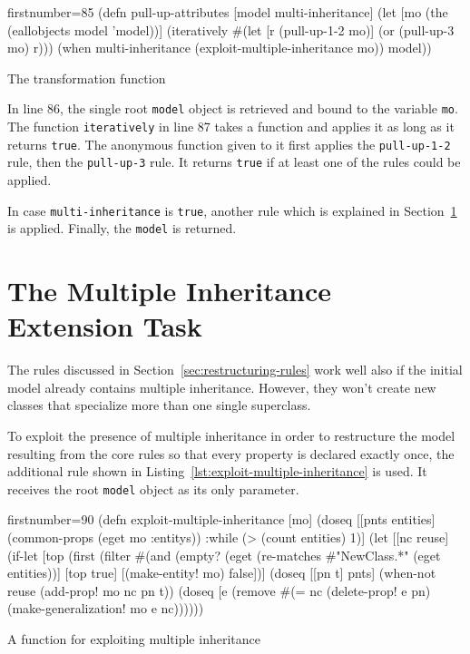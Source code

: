 \documentclass[11pt]{article}
\begin{document}
\begin{listing}[htbp]
  \begin{clojurecode*}{firstnumber=85}
(defn pull-up-attributes [model multi-inheritance]
  (let [mo (the (eallobjects model 'model))]
    (iteratively #(let [r (pull-up-1-2 mo)]
                    (or (pull-up-3 mo) r)))
    (when multi-inheritance (exploit-multiple-inheritance mo))
    model))
  \end{clojurecode*}
  \caption{The transformation function}
    \label{lst:pull-up-attributes}
\end{listing}

In line 86, the single root \verb|model| object is retrieved and bound to the
variable \verb|mo|.  The function \verb|iteratively| in line 87 takes a
function and applies it as long as it returns \verb|true|.  The anonymous
function given to it first applies the \verb|pull-up-1-2| rule, then the
\verb|pull-up-3| rule.  It returns \verb|true| if at least one of the rules
could be applied.

In case \verb|multi-inheritance| is \verb|true|, another rule which is
explained in Section~\ref{sec:extension-task} is applied.  Finally, the
\verb|model| is returned.



\section{The Multiple Inheritance Extension Task}
\label{sec:extension-task}

The rules discussed in Section~\ref{sec:restructuring-rules} work well also if
the initial model already contains multiple inheritance.  However, they won't
create new classes that specialize more than one single superclass.

To exploit the presence of multiple inheritance in order to restructure the
model resulting from the core rules so that every property is declared exactly
once, the additional rule shown in
Listing~\ref{lst:exploit-multiple-inheritance} is used.  It receives the root
\verb|model| object as its only parameter.

\begin{listing}[htbp]
  \begin{clojurecode*}{firstnumber=90}
(defn exploit-multiple-inheritance [mo]
  (doseq [[pnts entities] (common-props (eget mo :entitys))
          :while (> (count entities) 1)]
    (let [[nc reuse]
          (if-let [top (first (filter
                               #(and (empty? (eget %
                                     (re-matches #"NewClass.*" (eget %
                               entities))]
            [top true]
            [(make-entity! mo) false])]
      (doseq [[pn t] pnts]
        (when-not reuse
          (add-prop! mo nc pn t))
        (doseq [e (remove #(= nc %
          (delete-prop! e pn)
          (make-generalization! mo e nc))))))
  \end{clojurecode*}
  \caption{A function for exploiting multiple inheritance}
    \label{lst:exploit-multiple-inheritance}
\end{listing}
\end{document}
